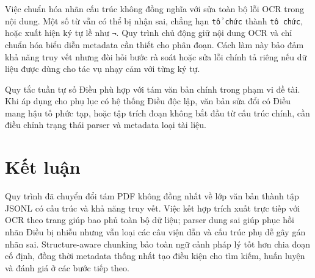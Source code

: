 \documentclass[12pt,a4paper]{article}
\newcommand{\code}[1]{\texttt{#1}}
\begin{document}
Việc chuẩn hóa nhãn cấu trúc không đồng nghĩa với sửa toàn bộ lỗi OCR trong nội
dung. Một số từ vẫn có thể bị nhận sai, chẳng hạn \code{tổ chức} thành
\code{tô chức}, hoặc xuất hiện ký tự lề như \code{¬}. Quy trình chủ động giữ nội
dung OCR và chỉ chuẩn hóa biểu diễn metadata cần thiết cho phân đoạn. Cách làm
này bảo đảm khả năng truy vết nhưng đòi hỏi bước rà soát hoặc sửa lỗi chính tả
riêng nếu dữ liệu được dùng cho tác vụ nhạy cảm với từng ký tự.

Quy tắc tuần tự số Điều phù hợp với tám văn bản chính trong phạm vi đề tài. Khi
áp dụng cho phụ lục có hệ thống Điều độc lập, văn bản sửa đổi có Điều mang hậu
tố phức tạp, hoặc tập trích đoạn không bắt đầu từ cấu trúc chính, cần điều chỉnh
trạng thái parser và metadata loại tài liệu.

\section{Kết luận}

Quy trình đã chuyển đổi tám PDF không đồng nhất về lớp văn bản thành tập JSONL
có cấu trúc và khả năng truy vết. Việc kết hợp trích xuất trực tiếp với OCR theo
trang giúp bao phủ toàn bộ dữ liệu; parser dung sai giúp phục hồi nhãn Điều bị
nhiễu nhưng vẫn loại các câu viện dẫn và cấu trúc phụ dễ gây gán nhãn sai.
Structure-aware chunking bảo toàn ngữ cảnh pháp lý tốt hơn chia đoạn cố định,
đồng thời metadata thống nhất tạo điều kiện cho tìm kiếm, huấn luyện và đánh giá
ở các bước tiếp theo.
\end{document}
